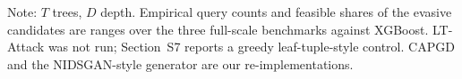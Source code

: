 \begin{table}[!htbp]
\smallskip
\footnotesize{Note: $T$ trees, $D$ depth. Empirical query counts and feasible shares of the evasive candidates are ranges over the three full-scale benchmarks against XGBoost. LT-Attack was not run; Section~S7 reports a greedy leaf-tuple-style control. CAPGD and the NIDSGAN-style generator are our re-implementations.}
\end{table}
